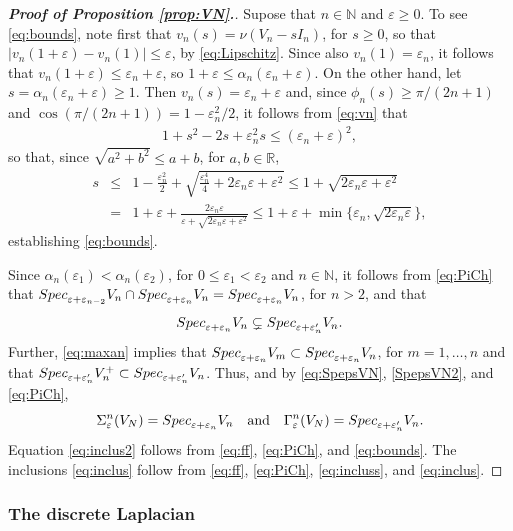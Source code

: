 \documentclass[preprint,1p,11pt]{elsarticle}
\newcommand\N{{\mathbb N}}
\newcommand\R{{\mathbb R}}
\newcommand\eps{{\varepsilon}}
\newcommand\Specn{{\rm Spec}}   %
\numberwithin{equation}{section}   %
\numberwithin{figure}{section}  %
\begin{document}
\begin{proof}[{\bf Proof of Proposition \ref{prop:VN}.}]
Supose that $n\in \N$ and $\eps\geq 0$. To see \eqref{eq:bounds}, note first that $v_n(s)=\nu(V_n-sI_n)$, for $s\geq 0$, so that$|v_n(1+\eps)-v_n(1)| \leq \eps$, by \eqref{eq:Lipschitz}. Since also $v_n(1)=\eps_n$, it follows that $v_n(1+\eps) \leq \eps_n+\eps$, so $1+\eps\leq \alpha_n(\eps_n+\eps)$. On the other hand, let $s=\alpha_n(\eps_n+\eps)\geq 1$. Then $v_n(s) = \eps_n + \eps$ and, since $\phi_n(s) \geq \pi/(2n+1)$ and $\cos(\pi/(2n+1))=1-\eps_n^2/2$, it follows from \eqref{eq:vn}  that
\begin{eqnarray*}
1+s^2-2s + \eps_n^2 s \leq (\eps_n+\eps)^2,
\end{eqnarray*}
so that, since $\sqrt{a^2+b^2} \leq a+b$, for $a,b\in \R$,
\begin{eqnarray*}
s &\leq& 1-\frac{\eps_n^2}{2} + \sqrt{\frac{\eps_n^4}{4} + 2\eps_n\eps + \eps^2}
 \leq  1 + \sqrt{2\eps_n\eps + \eps^2}\\
& = & 1 + \eps + \frac{2\eps_n\eps}{\eps +  \sqrt{2\eps_n\eps + \eps^2}} \leq  1 + \eps + \min\{\eps_n,\sqrt{2\eps_n\eps}\},
\end{eqnarray*}
establishing \eqref{eq:bounds}.

Since $\alpha_n(\eps_1) <\alpha_n(\eps_2)$, for $0\leq \eps_1<\eps_2$ and $n\in \N$, it follows from \eqref{eq:PiCh} that $\Specn_{\eps+\eps_{n-2}}V_n\cap \Specn_{\eps+\eps_{n}}V_n= \Specn_{\eps+\eps_{n}}V_n$, for $n>2$, and that 
\begin{equation} \label{eq:incluss}
\Specn_{\eps+\eps_{n}}V_n\subsetneq \Specn_{\eps+\eps'_n}V_n. 
\end{equation}
Further, \eqref{eq:maxan} implies that $\Specn_{\eps+\eps_n} V_m \subset \Specn_{\eps+\eps_n} V_n$, for $m=1,\ldots,n$ and that $\Specn_{\eps+\eps'_n} V^+_n \subset \Specn_{\eps+\eps'_n} V_n$. Thus, and by \eqref{eq:SpepsVN}, \eqref{SpepsVN2}, and \eqref{eq:PiCh},
\begin{equation} \label{eq:ff}
\Sigma_\eps^n(V_N) = \Specn_{\eps+\eps_n} V_n \quad \mbox{and} \quad
\Gamma_\eps^n(V_N) =  \Specn_{\eps+\eps'_n} V_n.
\end{equation}
Equation \eqref{eq:inclus2} follows from \eqref{eq:ff}, \eqref{eq:PiCh}, and \eqref{eq:bounds}. The inclusions \eqref{eq:inclus} follow from \eqref{eq:ff}, \eqref{eq:PiCh}, \eqref{eq:incluss}, and \eqref{eq:inclus}.
\end{proof}

\subsubsection{The discrete Laplacian} \label{sec:disLap2}
\end{document}
